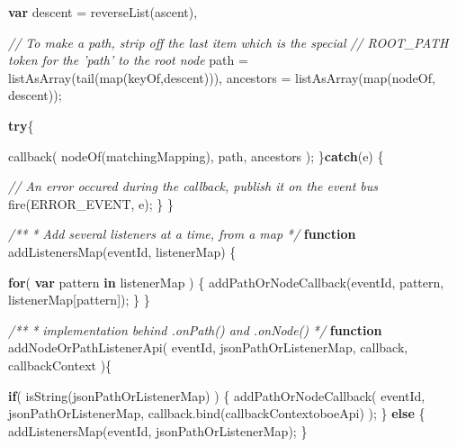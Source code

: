 \documentclass[]{article}
\newenvironment{Shaded}{}{}
\newcommand{\KeywordTok}[1]{\textcolor[rgb]{0.00,0.44,0.13}{\textbf{{#1}}}}
\newcommand{\CommentTok}[1]{\textcolor[rgb]{0.38,0.63,0.69}{\textit{{#1}}}}
\newcommand{\OtherTok}[1]{\textcolor[rgb]{0.00,0.44,0.13}{{#1}}}
\newcommand{\FunctionTok}[1]{\textcolor[rgb]{0.02,0.16,0.49}{{#1}}}
\newcommand{\NormalTok}[1]{{#1}}
\begin{document}
\begin{Shaded}
\begin{Highlighting}[]
      \KeywordTok{var} \NormalTok{descent     = }\FunctionTok{reverseList}\NormalTok{(ascent),}
      
          \CommentTok{// To make a path, strip off the last item which is the special}
          \CommentTok{// ROOT_PATH token for the 'path' to the root node}
          \NormalTok{path       = }\FunctionTok{listAsArray}\NormalTok{(}\FunctionTok{tail}\NormalTok{(}\FunctionTok{map}\NormalTok{(keyOf,descent))),}
          \NormalTok{ancestors  = }\FunctionTok{listAsArray}\NormalTok{(}\FunctionTok{map}\NormalTok{(nodeOf, descent)); }
      
      \KeywordTok{try}\NormalTok{\{}
      
         \FunctionTok{callback}\NormalTok{( }\FunctionTok{nodeOf}\NormalTok{(matchingMapping), path, ancestors );   }
      \NormalTok{\}}\KeywordTok{catch}\NormalTok{(e)  \{}
      
         \CommentTok{// An error occured during the callback, publish it on the event bus }
         \FunctionTok{fire}\NormalTok{(ERROR_EVENT, e);}
      \NormalTok{\}          }
   \NormalTok{\}}

   \CommentTok{/**}
\CommentTok{    * Add several listeners at a time, from a map}
\CommentTok{    */}
   \KeywordTok{function} \FunctionTok{addListenersMap}\NormalTok{(eventId, listenerMap) \{}
   
      \KeywordTok{for}\NormalTok{( }\KeywordTok{var} \NormalTok{pattern }\KeywordTok{in} \NormalTok{listenerMap ) \{}
         \FunctionTok{addPathOrNodeCallback}\NormalTok{(eventId, pattern, listenerMap[pattern]);}
      \NormalTok{\}}
   \NormalTok{\}    }
      
   \CommentTok{/**}
\CommentTok{    * implementation behind .onPath() and .onNode()}
\CommentTok{    */}       
   \KeywordTok{function} \FunctionTok{addNodeOrPathListenerApi}\NormalTok{( eventId, jsonPathOrListenerMap,}
                                      \NormalTok{callback, callbackContext )\{}
 
      \KeywordTok{if}\NormalTok{( }\FunctionTok{isString}\NormalTok{(jsonPathOrListenerMap) ) \{}
         \FunctionTok{addPathOrNodeCallback}\NormalTok{( }
            \NormalTok{eventId, }
            \NormalTok{jsonPathOrListenerMap, }
            \OtherTok{callback}\NormalTok{.}\FunctionTok{bind}\NormalTok{(callbackContext\textbar{}\textbar{}oboeApi)}
         \NormalTok{);}
      \NormalTok{\} }\KeywordTok{else} \NormalTok{\{}
         \FunctionTok{addListenersMap}\NormalTok{(eventId, jsonPathOrListenerMap);}
      \NormalTok{\}}
      

\end{Highlighting}
\end{Shaded}
\end{document}

